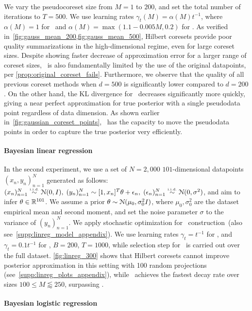 %
We vary the pseudocoreset size from $M=1$ to $200$, and set the total number of
iterations to $ T =  500$. We use learning rates $ \gamma_t(M) = \alpha(M)
t^{-1}$, where  $ \alpha(M) = 1 $ for \sparsevi~and $ \alpha(M) = \max(1.1 - 0.005M, 0.2)
$ for \psvi.  As verified in~\cref{fig:gauss_mean_200,fig:gauss_mean_500},
Hilbert coresets provide poor quality summarizations in the high-dimensional
regime, even for large coreset sizes.  Despite showing faster decrease of
approximation error for a larger range of coreset sizes, \sparsevi~is also
fundamentally limited by the use of the original datapoints, per
\cref{prop:original_coreset_fails}.  Furthermore, we observe that the quality of all
previous coreset methods when $d=500$ is significantly lower
compared to $d=200$. On the other hand, the KL divergence for  \psvi~decreases
significantly more quickly, giving a near perfect approximation for true
posterior with a single pseudodata point regardless of data dimension. As
shown earlier in~\cref{fig:gaussian_coreset_points}, \psvi~has the capacity to move the
pseudodata points in order to capture the
true posterior very efficiently. 

\paragraph{Bayesian linear regression}
\label{section:linreg_experiment}
In the second experiment, we use a set of ${N=2,000}$ 
$101$-dimensional datapoints $(x_n,y_n)_{n=1}^{N}$ generated as follows: $(x_n)_{n=1}^N  \distiid \distNorm(0, I),\; (y_n)_{n=1}^N  \dist [1, x_n]^T\theta + \epsilon_n,\;  (\epsilon_n)_{n=1}^{N} \distiid \distNorm(0, \sigma^2)$, and aim to infer $\theta \in \mathbb{R}^{101}$. We assume a prior $\theta \sim \mathcal{N}(\mu_0,\sigma_0^2 I)$, where $ \mu_0, \sigma_0^2$ are the dataset empirical mean and second moment, and set the noise parameter $ \sigma$ to the variance of $(y_n)_{n=1}^{N}$. We apply stochastic optimization for \psvi~construction~(also see~\cref{supp:linreg_model_appendix}). We use learning rates $\gamma_t = t^{-1}$ for \sparsevi, and $\gamma_t = 0.1t^{-1}$ for \psvi, $B=200$, $T=1000$, while selection step for \sparsevi~is carried out over the full dataset. \cref{fig:linreg_300} shows that Hilbert coresets cannot improve posterior approximation in this setting with 100 random projections (see~\cref{supp:linreg_plots_appendix}), 
while \psvi~achieves the fastest decay rate over sizes $ 100 \leq M \lessapprox 250$, surpassing \sparsevi.

\paragraph{Bayesian logistic regression}
\label{section:logreg_experiment}


